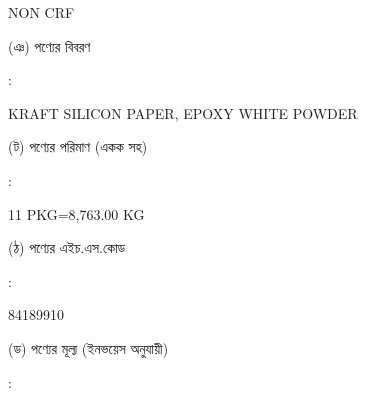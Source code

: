 \documentclass[12pt]{article}
\newcommand{\good}{KRAFT SILICON PAPER, EPOXY WHITE POWDER}
\newcommand{\pkg}{11 PKG=8,763.00 KG}
\newcommand{\crf}{NON CRF}
\newcommand{\crfdt}{}
\newcommand{\hscode}{84189910}
\begin{document}
\begin{minipage}[t]{0.53\linewidth}
{\crf} \hspace{2em} {\crfdt}
\\
\end{minipage}
\begin{minipage}[t]{0.05\linewidth}
\hspace*{1em}
\end{minipage}
\begin{minipage}[t]{0.40\linewidth}
(ঞ) পণ্যের বিবরণ
\end{minipage}
\begin{minipage}[t]{0.02\linewidth}
:
\end{minipage}
\begin{minipage}[t]{0.53\linewidth}
{\good}
\\
\end{minipage}
\begin{minipage}[t]{0.05\linewidth}
\hspace*{1em}
\end{minipage}
\begin{minipage}[t]{0.40\linewidth}
(ট) পণ্যের পরিমাণ (একক সহ)
\end{minipage}
\begin{minipage}[t]{0.02\linewidth}
:
\end{minipage}
\begin{minipage}[t]{0.53\linewidth}
{\pkg}
\\
\end{minipage}
\begin{minipage}[t]{0.05\linewidth}
\hspace*{1em}
\end{minipage}
\begin{minipage}[t]{0.40\linewidth}
(ঠ) পণ্যের এইচ.এস.কোড
\end{minipage}
\begin{minipage}[t]{0.02\linewidth}
:
\end{minipage}
\begin{minipage}[t]{0.53\linewidth}
{\hscode}
\\
\end{minipage}
\begin{minipage}[t]{0.05\linewidth}
\hspace*{1em}
\end{minipage}
\begin{minipage}[t]{0.40\linewidth}
(ড) পণ্যের মূল্য (ইনভয়েস অনুযায়ী)
\end{minipage}
\begin{minipage}[t]{0.02\linewidth}
:
\end{minipage}
\end{document}
